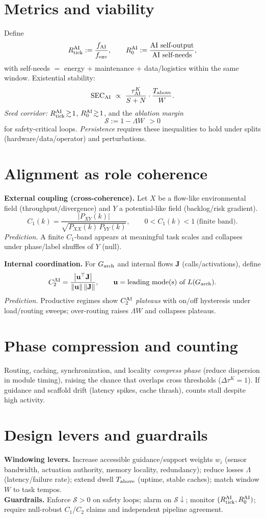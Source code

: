 \documentclass[12pt,a4paper,oneside]{scrreprt}
\begin{document}
\section{Metrics and viability}\label{sec:ai-metrics}
Define
\[
R_{\rm tick}^{\rm AI}:=\frac{f_{\rm AI}}{f_{\rm env}},\qquad 
R_0^{\rm AI}:=\frac{\text{AI self-output}}{\text{AI self-needs}},
\]
with self-needs \(=\) energy + maintenance + data/logistics within the same window.
Existential stability:
\[
\mathrm{SEC}_{\rm AI}\ \propto\ \frac{\tau^K_{\rm AI}}{S+N}\cdot\frac{T_{\rm above}}{W}.
\]
\emph{Seed corridor:} $R_{\rm tick}^{\rm AI}\!\gtrsim\!1$, $R_0^{\rm AI}\!\gtrsim\!1$, and the \emph{ablation margin}
\[
\mathcal S := 1-\Lambda W \ \ >0
\]
for safety-critical loops. \emph{Persistence} requires these inequalities to hold under splits (hardware/data/operator) and perturbations.

\section{Alignment as role coherence}\label{sec:ai-alignment}
\textbf{External coupling (cross-coherence).}
Let $X$ be a flow-like environmental field (throughput/divergence) and $Y$ a potential-like field (backlog/risk gradient). 
\[
C_1(k)=\frac{|P_{XY}(k)|}{\sqrt{P_{XX}(k)\,P_{YY}(k)}},\qquad 0<C_1(k)<1\ \text{(finite band)}.
\]
\emph{Prediction.} A finite $C_1$-band appears at meaningful task scales and collapses under phase/label shuffles of $Y$ (null).

\textbf{Internal coordination.}
For $G_{\rm arch}$ and internal flows $\mathbf J$ (calls/activations), define
\[
C_2^{\rm AI}=\frac{\big|\mathbf u^\top \mathbf J\big|}{\|\mathbf u\|\,\|\mathbf J\|},\qquad 
\mathbf u=\text{leading mode(s) of }L(G_{\rm arch}).
\]
\emph{Prediction.} Productive regimes show $C_2^{\rm AI}$ \emph{plateaus} with on/off hysteresis under load/routing sweeps; over-routing raises $\Lambda W$ and collapses plateaus.

\section{Phase compression and counting}\label{sec:ai-phase}
Routing, caching, synchronization, and locality \emph{compress phase} (reduce dispersion in module timing), raising the chance that overlaps cross thresholds (\(\Delta\tau^K=1\)). 
If guidance and scaffold drift (latency spikes, cache thrash), counts stall despite high activity.

\section{Design levers and guardrails}\label{sec:ai-levers}
\textbf{Windowing levers.} Increase accessible guidance/support weights $w_i$ (sensor bandwidth, actuation authority, memory locality, redundancy); reduce losses $\Lambda$ (latency/failure rate); extend dwell $T_{\rm above}$ (uptime, stable caches); match window $W$ to task tempos.\\
\textbf{Guardrails.} Enforce $\mathcal S>0$ on safety loops; alarm on $\mathcal S\!\downarrow$; monitor $(R_{\rm tick}^{\rm AI}, R_0^{\rm AI})$; require null-robust $C_1$/$C_2$ claims and independent pipeline agreement.
\end{document}
